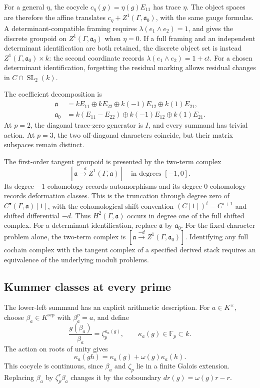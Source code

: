 For a general \(\eta\), the cocycle \(c_\eta(g)=\eta(g)E_{11}\) has trace
\(\eta\). The object spaces are therefore the affine translates
\(c_\eta+Z^1(\Gamma,\mathfrak a_0)\), with the same gauge formulas.
A determinant-compatible framing requires
\(\lambda(e_1\wedge e_2)=1\), and gives the discrete groupoid on
\(Z^1(\Gamma,\mathfrak a_0)\) when \(\eta=0\).
If a full framing and an independent determinant identification are both
retained, the discrete object set is instead
\(Z^1(\Gamma,\mathfrak a_0)\times k\): the second coordinate records
\(\lambda(e_1\wedge e_2)=1+\epsilon t\).
For a chosen determinant identification, forgetting the residual marking
allows residual changes in \(C\cap\operatorname{SL}_2(k)\).

The coefficient decomposition is
\begin{align*}
 \mathfrak a&=kE_{11}\oplus kE_{22}\oplus k(-1)E_{12}\oplus k(1)E_{21},\\
 \mathfrak a_0&=k(E_{11}-E_{22})\oplus k(-1)E_{12}\oplus k(1)E_{21}.
\end{align*}
At \(p=2\), the diagonal trace-zero generator is \(I\), and every
summand has trivial action. At \(p=3\), the two off-diagonal characters
coincide, but their matrix subspaces remain distinct.

The first-order tangent groupoid is presented by the two-term complex
\[
 [\mathfrak a\xrightarrow{-d}Z^1(\Gamma,\mathfrak a)]
 \quad\text{in degrees }[-1,0].
\]
Its degree \(-1\) cohomology records automorphisms and its degree \(0\)
cohomology records deformation classes. This is the truncation through
degree zero of \(C^\bullet(\Gamma,\mathfrak a)[1]\), with the cohomological
shift convention \((C[1])^i=C^{i+1}\) and shifted differential \(-d\).
Thus \(H^2(\Gamma,\mathfrak a)\) occurs in degree one of the full shifted complex.
For a determinant identification, replace \(\mathfrak a\) by \(\mathfrak a_0\).
For the fixed-character problem alone, the two-term complex is
\([\mathfrak a\xrightarrow{-d}Z^1(\Gamma,\mathfrak a_0)]\).
Identifying any full cochain complex with the tangent complex of a
specified derived stack requires an equivalence of the underlying
moduli problems.

\subsection{Kummer classes at every prime}

The lower-left summand has an explicit arithmetic description.
For \(a\in K^\times\), choose \(\beta_a\in K^{\mathrm{sep}}\) with
\(\beta_a^p=a\), and define
\[
 \frac{g(\beta_a)}{\beta_a}=\zeta_p^{\kappa_a(g)},
 \qquad \kappa_a(g)\in\mathbb F_p\subset k.
\]
The action on roots of unity gives
\[
 \kappa_a(gh)=\kappa_a(g)+\omega(g)\kappa_a(h).
\]
This cocycle is continuous, since \(\beta_a\) and \(\zeta_p\) lie in a
finite Galois extension. Replacing \(\beta_a\) by \(\zeta_p^r\beta_a\)
changes it by the coboundary \(dr(g)=\omega(g)r-r\).

